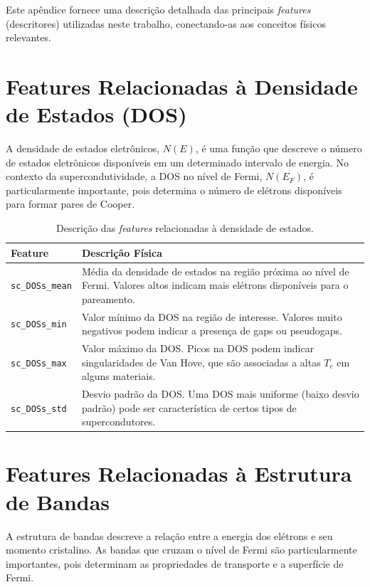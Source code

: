 \documentclass[12pt, a4paper, oneside]{report}
\begin{document}
Este apêndice fornece uma descrição detalhada das principais \textit{features} (descritores) utilizadas neste trabalho, conectando-as aos conceitos físicos relevantes.

\section{Features Relacionadas à Densidade de Estados (DOS)}

A densidade de estados eletrônicos, $N(E)$, é uma função que descreve o número de estados eletrônicos disponíveis em um determinado intervalo de energia. No contexto da supercondutividade, a DOS no nível de Fermi, $N(E_F)$, é particularmente importante, pois determina o número de elétrons disponíveis para formar pares de Cooper.

\begin{table}[H]
    \centering
    \caption{Descrição das \textit{features} relacionadas à densidade de estados.}
    \begin{tabular}{lp{10cm}}
        \toprule
        \textbf{Feature} & \textbf{Descrição Física} \\
        \midrule
        \texttt{sc\_DOSs\_mean} & Média da densidade de estados na região próxima ao nível de Fermi. Valores altos indicam mais elétrons disponíveis para o pareamento. \\
        \texttt{sc\_DOSs\_min} & Valor mínimo da DOS na região de interesse. Valores muito negativos podem indicar a presença de gaps ou pseudogaps. \\
        \texttt{sc\_DOSs\_max} & Valor máximo da DOS. Picos na DOS podem indicar singularidades de Van Hove, que são associadas a altas $T_c$ em alguns materiais. \\
        \texttt{sc\_DOSs\_std} & Desvio padrão da DOS. Uma DOS mais uniforme (baixo desvio padrão) pode ser característica de certos tipos de supercondutores. \\
        \bottomrule
    \end{tabular}
\end{table}

\section{Features Relacionadas à Estrutura de Bandas}

A estrutura de bandas descreve a relação entre a energia dos elétrons e seu momento cristalino. As bandas que cruzam o nível de Fermi são particularmente importantes, pois determinam as propriedades de transporte e a superfície de Fermi.
\end{document}
